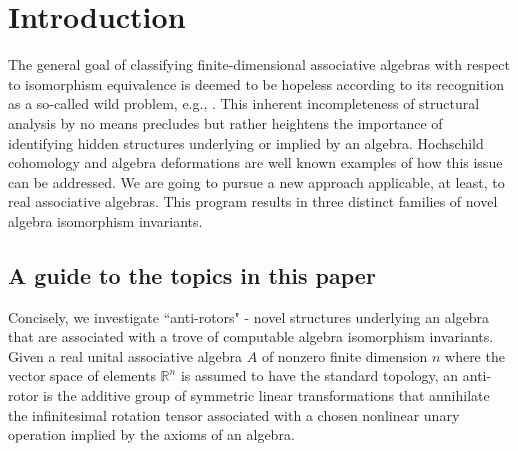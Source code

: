 \documentclass{amsart}
\numberwithin{equation}{section}
\theoremstyle{definition}
\numberwithin{theorem}{section}
\begin{document}
 \tableofcontents
 
 \section{Introduction} The general goal of classifying finite-dimensional associative algebras with respect to isomorphism equivalence is deemed to be hopeless according to its recognition as a so-called wild problem, e.g., \cite{eom:2024,drozd:1972,belitskii:2005}.   This inherent incompleteness of structural analysis by no means precludes but rather heightens the importance of identifying hidden structures underlying or implied by an algebra.  Hochschild \mbox{cohomology} \cite{hochschild:1945} and algebra deformations \cite{gerstenhaber:1964} are well known examples of how this issue can be addressed.  We are going to pursue a new approach applicable, at least, to real associative algebras.  This program results in three distinct families of novel algebra isomorphism invariants.
 
\subsection{A guide to the topics in this paper} 
Concisely, we investigate ``anti-rotors" -  novel structures underlying an algebra that are associated with a trove of computable algebra isomorphism invariants.
Given a real unital associative algebra $A$ of nonzero finite dimension $n$ where the vector space of elements $\mathbb{R}^n$ is assumed to have the standard topology, an \mbox{anti-rotor} is the additive group of symmetric linear transformations that annihilate the infinitesimal rotation tensor associated with a chosen nonlinear unary operation implied by the axioms of an algebra.  
\end{document}

